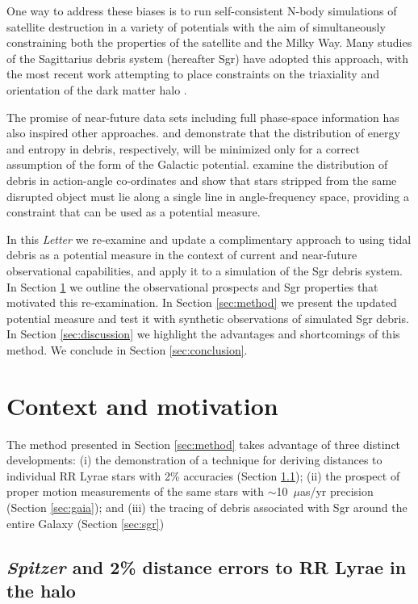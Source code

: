 \documentclass{emulateapj}
\begin{document}
One way to address these biases is to run self-consistent N-body simulations of satellite destruction in a variety of potentials with the aim of simultaneously constraining both the properties of the satellite and the Milky Way.
Many studies of the Sagittarius debris system (hereafter Sgr) have adopted this approach,
with the most recent work attempting to place constraints on the triaxiality and orientation of the dark matter halo
\citep{law10}.

The promise of near-future data sets including full phase-space information has also inspired other approaches. \citet{binney08} and \citet{penarrubia12} demonstrate that the distribution of energy and entropy in debris, respectively, will be minimized only for a correct
assumption of the form of the Galactic potential.
\citet{sanders13b} examine the distribution of debris in action-angle co-ordinates and show that stars stripped from the same disrupted object must lie along a single line in angle-frequency space, providing a constraint that can be used as a potential measure.

In this \emph{Letter} we re-examine and update a complimentary approach to using tidal debris as a potential measure \citep[originally proposed by][]{johnston99a}  in the context of current and near-future observational capabilities, and apply it to a simulation of the Sgr debris system.
In Section \ref{sec:context} we outline the observational prospects and Sgr properties that motivated this re-examination.
In Section \ref{sec:method} we present the updated potential measure and test it with synthetic observations of simulated Sgr debris.
In Section \ref{sec:discussion} we highlight the advantages and shortcomings of this method.
We conclude in Section \ref{sec:conclusion}.

\section{Context and motivation} \label{sec:context}
The method presented in Section \ref{sec:method} takes advantage of
three distinct developments: (i)
the demonstration of a technique for deriving distances to individual
RR Lyrae stars with 2\% accuracies (Section \ref{sec:spitzer}); (ii)
the prospect of proper motion measurements of the same stars with
$\sim$10~$\mu$as/yr precision (Section \ref{sec:gaia}); and (iii) the
tracing of debris associated with Sgr around the entire Galaxy
(Section \ref{sec:sgr})

\subsection{{\it Spitzer} and 2\% distance errors to RR Lyrae in the halo}
\label{sec:spitzer}
\end{document}
